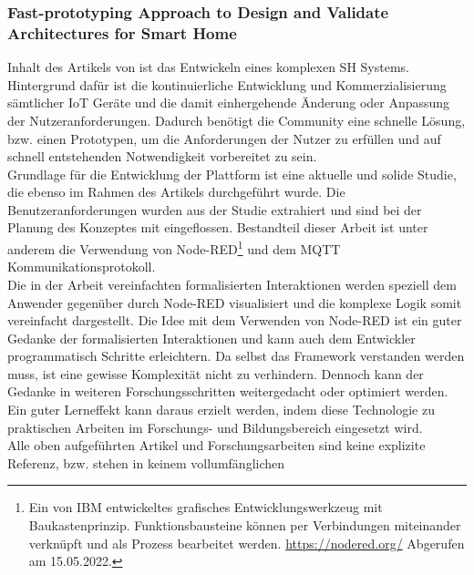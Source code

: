         \subsubsection*{Fast-prototyping Approach to Design and Validate Architectures for Smart Home}  
            Inhalt des Artikels von \cite{Montanaro2021} ist das Entwickeln eines komplexen \acl{SH} Systems. 
            Hintergrund dafür ist die kontinuierliche Entwicklung und Kommerzialisierung sämtlicher \acs{IoT} Geräte und 
            die damit einhergehende Änderung oder Anpassung der Nutzeranforderungen. Dadurch benötigt die Community eine 
            schnelle Lösung, bzw. einen Prototypen, um die Anforderungen der Nutzer zu erfüllen und auf schnell 
            entstehenden Notwendigkeit vorbereitet zu sein. 
            \\
            Grundlage für die Entwicklung der Plattform ist eine aktuelle und solide Studie, die ebenso im Rahmen des 
            Artikels durchgeführt wurde. Die Benutzeranforderungen wurden aus der Studie extrahiert und sind bei der 
            Planung des Konzeptes mit eingeflossen. Bestandteil dieser Arbeit ist unter anderem die Verwendung von Node-RED\footnote{Ein von IBM entwickeltes grafisches Entwicklungswerkzeug mit Baukastenprinzip. Funktionsbausteine können per Verbindungen miteinander verknüpft und als Prozess bearbeitet werden. \url{https://nodered.org/} Abgerufen am 15.05.2022.} und 
            dem \acs{MQTT} Kommunikationsprotokoll. 
            \\
            \linebreak
            Die in der Arbeit vereinfachten formalisierten Interaktionen werden speziell dem Anwender gegenüber durch 
            Node-RED visualisiert und die komplexe Logik somit vereinfacht dargestellt. Die Idee mit dem Verwenden von Node-RED 
            ist ein guter Gedanke der formalisierten Interaktionen und kann auch dem Entwickler programmatisch Schritte 
            erleichtern. Da selbst das Framework verstanden werden muss, ist eine gewisse Komplexität nicht zu verhindern. 
            Dennoch kann der Gedanke in weiteren Forschungsschritten weitergedacht oder optimiert werden. Ein guter Lerneffekt 
            kann daraus erzielt werden, indem diese Technologie zu praktischen Arbeiten im Forschungs- und Bildungsbereich 
            eingesetzt wird.
    \\
    \linebreak
    Alle oben aufgeführten Artikel und Forschungsarbeiten sind keine explizite Referenz, bzw. stehen in keinem vollumfänglichen 

